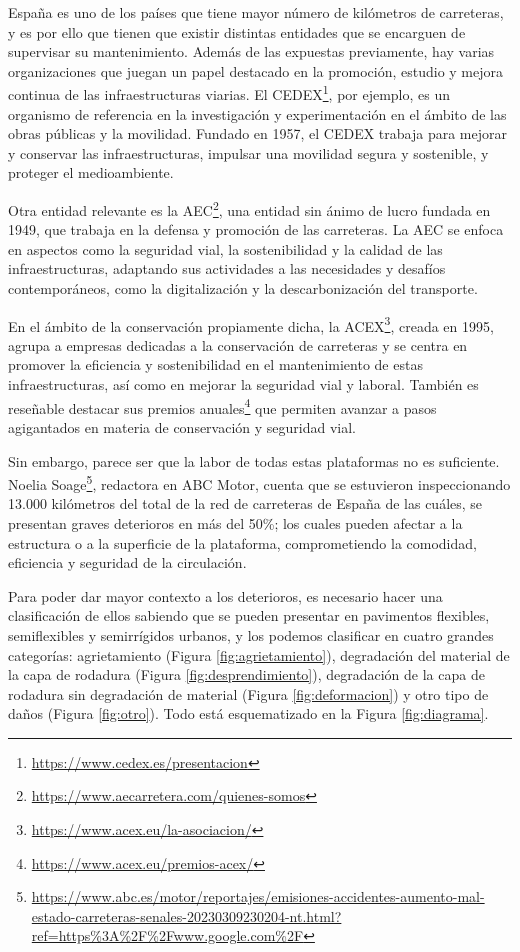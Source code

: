 España es uno de los países que tiene mayor número de kilómetros de carreteras, y es por ello que tienen que existir distintas entidades que se encarguen de supervisar su mantenimiento. Además de las expuestas previamente, hay varias organizaciones que juegan un papel destacado en la promoción, estudio y mejora continua de las infraestructuras viarias. El \ac{CEDEX}\footnote{\url{https://www.cedex.es/presentacion}}, por ejemplo, es un organismo de referencia en la investigación y experimentación en el ámbito de las obras públicas y la movilidad. Fundado en 1957, el \acs{CEDEX} trabaja para mejorar y conservar las infraestructuras, impulsar una movilidad segura y sostenible, y proteger el medioambiente.

Otra entidad relevante es la \ac{AEC}\footnote{\url{https://www.aecarretera.com/quienes-somos}}, una entidad sin ánimo de lucro fundada en 1949, que trabaja en la defensa y promoción de las carreteras. La \acs{AEC} se enfoca en aspectos como la seguridad vial, la sostenibilidad y la calidad de las infraestructuras, adaptando sus actividades a las necesidades y desafíos contemporáneos, como la digitalización y la descarbonización del transporte.

En el ámbito de la conservación propiamente dicha, la \ac{ACEX}\footnote{\url{https://www.acex.eu/la-asociacion/}}, creada en 1995, agrupa a empresas dedicadas a la conservación de carreteras y se centra en promover la eficiencia y sostenibilidad en el mantenimiento de estas infraestructuras, así como en mejorar la seguridad vial y laboral. También es reseñable destacar sus premios anuales\footnote{\url{https://www.acex.eu/premios-acex/}} que permiten avanzar a pasos agigantados en materia de conservación y seguridad vial.


Sin embargo, parece ser que la labor de todas estas plataformas no es suficiente. Noelia Soage\footnote{\url{https://www.abc.es/motor/reportajes/emisiones-accidentes-aumento-mal-estado-carreteras-senales-20230309230204-nt.html?ref=https\%3A\%2F\%2Fwww.google.com\%2F}}, redactora en ABC Motor, cuenta que se estuvieron inspeccionando 13.000 kilómetros del total de la red de carreteras de España de las cuáles, se presentan graves deterioros en más del 50\%; los cuales pueden afectar a la estructura o a la superficie de la plataforma, comprometiendo la comodidad, eficiencia y seguridad de la circulación.


Para poder dar mayor contexto a los deterioros, es necesario hacer una clasificación de ellos sabiendo que se pueden presentar en pavimentos flexibles, semiflexibles y semirrígidos urbanos, y los podemos clasificar en cuatro grandes categorías: agrietamiento (Figura \ref{fig:agrietamiento}), degradación del material de la capa de rodadura (Figura \ref{fig:desprendimiento}), degradación de la capa de rodadura sin degradación de material (Figura \ref{fig:deformacion}) y otro tipo de daños (Figura \ref{fig:otro}). Todo está esquematizado en la Figura \ref{fig:diagrama}.\\

